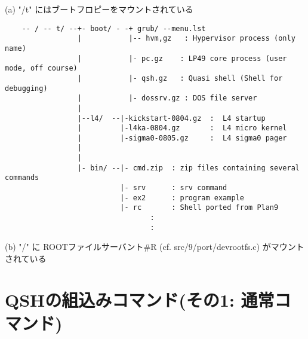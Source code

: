     (a) "/t" にはブートフロピーをマウントされている

{\small
\begin{verbatim}
    -- / -- t/ --+- boot/ - -+ grub/ --menu.lst
                 |           |-- hvm,gz   : Hypervisor process (only name)
                 |           |- pc.gz    : LP49 core process (user mode, off course)
                 |           |- qsh.gz   : Quasi shell (Shell for debugging)
                 |           |- dossrv.gz : DOS file server  
                 |                                             
                 |--l4/  --|-kickstart-0804.gz  :  L4 startup 
                 |         |-l4ka-0804.gz       :  L4 micro kernel
                 |         |-sigma0-0805.gz     :  L4 sigma0 pager
                 |                                             
                 |                                             
                 |- bin/ --|- cmd.zip  : zip files containing several commands
                           |- srv      : srv command
                           |- ex2      : program example
                           |- rc       : Shell ported from Plan9
                                  :
                                  :
\end{verbatim}
}

    (b) "/" に ROOTファイルサーバント\#R (cf. src/9/port/devrootfs.c) がマウントされている
           

\section{QSHの組込みコマンド(その1: 通常コマンド)}

